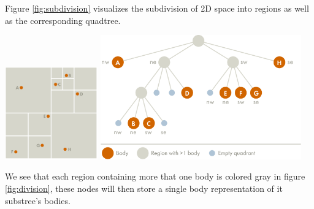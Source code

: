 Figure \ref{fig:subdivision} visualizes the subdivision of 2D space into regions
as well as the corresponding quadtree.
\begin{Figure}
  \centering
  \includegraphics[width=0.30\textwidth]{assests/example-space}
  \includegraphics[width=0.65\textwidth]{assests/example-tree}
  \label{fig:subdivision}
\end{Figure}
We see that each region containing more that one body is colored gray in figure
\ref{fig:division}, these nodes will then store a single body representation of
it substree's bodies.
